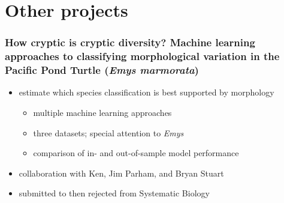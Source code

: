 \documentclass{beamer}
\begin{document}
\section{Other projects}

\begin{frame}
  \frametitle{How cryptic is cryptic diversity? Machine learning approaches to classifying morphological variation in the Pacific Pond Turtle (\textit{Emys marmorata})}
  \begin{itemize}
    \item estimate which species classification is best supported by morphology
      \begin{itemize}
        \item multiple machine learning approaches
        \item three datasets; special attention to \textit{Emys}
        \item comparison of in- and out-of-sample model performance
      \end{itemize}
    \item collaboration with Ken, Jim Parham, and Bryan Stuart
    \item submitted to then rejected from Systematic Biology
  \end{itemize}
\end{frame}
\end{document}

